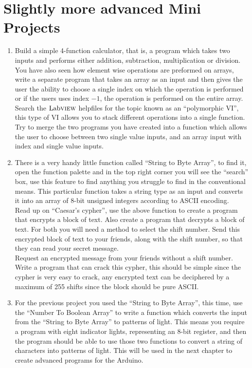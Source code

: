 \section{Slightly more advanced Mini Projects}
\begin{enumerate}
	\item Build a simple 4-function calculator, that is, a program which takes two inputs and performs either addition, subtraction, multiplication or division.\\
	
	You have also seen how element wise operations are preformed on arrays, write a separate program that takes an array as an input and then gives the user the ability to choose a single index on which the operation is performed or if the users uses index $-1$, the operation is performed on the entire array.\\
	
	Search the $\text{Lab}\textsc{view}$ helpfiles for the topic known as an ``polymorphic VI'', this type of VI allows you to stack different operations into a single function. Try to merge the two programs you have created into a function which allows the user to choose between two single value inputs, and an array input with index and single value inputs.
	
	\item There is a very handy little function called ``String to Byte Array'', to find it, open the function palette and in the top right corner you will see the ``search'' box, use this feature to find anything you struggle to find in the conventional means. This particular function takes a string type as an input and converts it into an array of 8-bit unsigned integers according to ASCII encoding.\\
	
	Read up on ``Caesar's cypher'', use the above function to create a program that encrypts a block of text. Also create a program that decrypts a block of text. For both you will need a method to select the shift number. Send this encrypted block of text to your friends, along with the shift number, so that they can read your secret message.\\
	
	Request an encrypted message from your friends without a shift number. Write a program that can crack this cypher, this should be simple since the cypher is very easy to crack, any encrypted text can be deciphered by a maximum of 255 shifts since the block should be pure ASCII.
	
	\item For the previous project you used the ``String to Byte Array'', this time, use the ``Number To Boolean Array'' to write a function which converts the input from the ``String to Byte Array'' to patterns of light. This means you require a program with eight indicator lights, representing an 8-bit register, and then the program should be able to use those two functions to convert a string of characters into patterns of light. This will be used in the next chapter to create advanced programs for the Arduino.\\
	

\end{enumerate}
